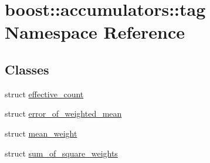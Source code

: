 \hypertarget{namespaceboost_1_1accumulators_1_1tag}{}\section{boost\+:\+:accumulators\+:\+:tag Namespace Reference}
\label{namespaceboost_1_1accumulators_1_1tag}
\subsection*{Classes}
\begin{DoxyCompactItemize}
\item 
struct \hyperlink{structboost_1_1accumulators_1_1tag_1_1effective__count}{effective\+\_\+count}
\item 
struct \hyperlink{structboost_1_1accumulators_1_1tag_1_1error__of__weighted__mean}{error\+\_\+of\+\_\+weighted\+\_\+mean}
\item 
struct \hyperlink{structboost_1_1accumulators_1_1tag_1_1mean__weight}{mean\+\_\+weight}
\item 
struct \hyperlink{structboost_1_1accumulators_1_1tag_1_1sum__of__square__weights}{sum\+\_\+of\+\_\+square\+\_\+weights}
\end{DoxyCompactItemize}

